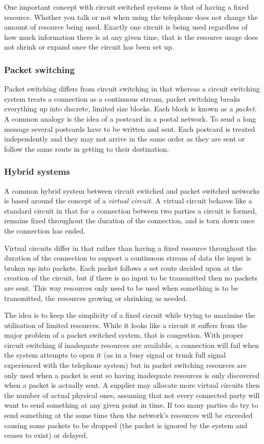 One important concept with circuit switched systems is that of having
a fixed resource.  Whether you talk or not when using the telephone
does not change the amount of resource being used.  Exactly one
circuit is being used regardless of how much information there is at
any given time, that is the resource usage does not shrink or expand
once the circuit has been set up.

\subsubsection{Packet switching}

Packet switching differs from circuit switching in that whereas a
circuit switching system treats a connection as a continuous stream,
packet switching breaks everything up into discrete, limited size
blocks.  Each block is known as a {\em packet}.  A common analogy is
the idea of a postcard in a postal network.  To send a long message
several postcards have to be written and sent.  Each postcard is
treated independently and they may not arrive in the same order as
they are sent or follow the same route in getting to their
destination.

\subsubsection{Hybrid systems}

A common hybrid system between circuit switched and packet switched
networks is based around the concept of a {\em virtual circuit}.  A
virtual circuit behaves like a standard circuit in that for a
connection between two parties a circuit is formed, remains fixed
throughout the duration of the connection, and is torn down once the
connection has ended.

Virtual circuits differ in that rather than having a fixed resource
throughout the duration of the connection to support a continuous
stream of data the input is broken up into packets.  Each packet
follows a set route decided upon at the creation of the circuit, but
if there is no input to be transmitted then no packets are sent.  This
way resources only need to be used when something is to be
transmitted, the resources growing or shrinking as needed.

The idea is to keep the simplicity of a fixed circuit while trying to
maximise the utilisation of limited resources.  While it looks like a
circuit it suffers from the major problem of a packet switched system,
that is congestion.  With proper circuit switching if inadequate
resources are available, a connection will fail when the system
attempts to open it (as in a busy signal or trunk full signal
experienced with the telephone system) but in packet switching
resources are only used when a packet is sent so having inadequate
resources is only discovered when a packet is actually sent.  A
supplier may allocate more virtual circuits then the number of actual
physical ones, assuming that not every connected party will want to
send something at any given point in time.  If too many parties do try
to send something at the same time then the network's resources will
be exceeded causing some packets to be dropped (the packet is ignored
by the system and ceases to exist) or delayed.


